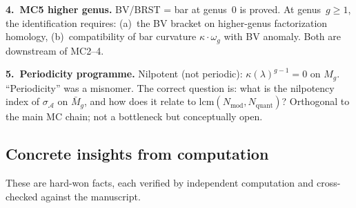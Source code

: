 \documentclass[11pt]{article}
\newcommand{\cA}{\mathcal{A}}
\begin{document}
\medskip\noindent
\textbf{4.\ MC5 higher genus.}
BV/BRST = bar at genus~$0$ is proved.  At genus~$g \geq 1$, the
identification requires: (a)~the BV bracket on higher-genus
factorization homology, (b)~compatibility of bar curvature
$\kappa\cdot\omega_g$ with BV anomaly.  Both are downstream of MC2--4.

\medskip\noindent
\textbf{5.\ Periodicity programme.}
Nilpotent (not periodic): $\kappa(\lambda)^{g-1} = 0$ on $M_g$.
``Periodicity'' was a misnomer.  The correct question is: what is the
nilpotency index of $\sigma_{\cA}$ on $\bar{M}_g$, and how does it
relate to $\mathrm{lcm}(N_{\mathrm{mod}}, N_{\mathrm{quant}})$?
Orthogonal to the main MC chain; not a bottleneck but conceptually open.


\subsection{Concrete insights from computation}

These are hard-won facts, each verified by independent computation
and cross-checked against the manuscript.
\end{document}
